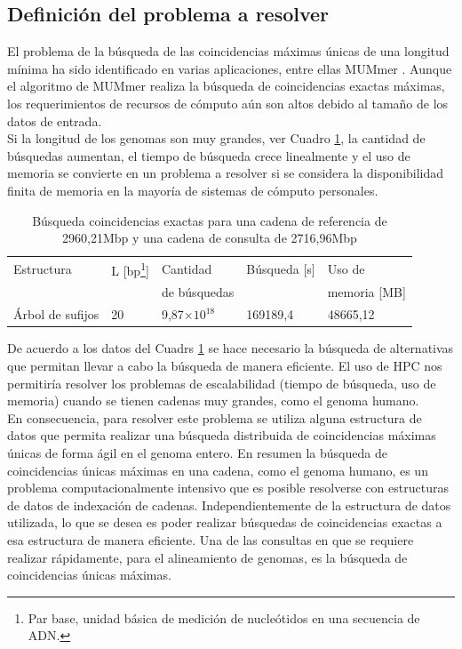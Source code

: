 \documentclass[12pt,a4paper]{article}
\providecommand{\e}[1]{\ensuremath{\times 10^{#1}}}
\begin{document}
\subsection{Definición del problema a resolver}
\indent
El problema de la búsqueda de las coincidencias máximas únicas de una longitud mínima ha sido identificado en varias aplicaciones, entre ellas MUMmer \cite{Mummer3}. Aunque el algoritmo de MUMmer realiza la búsqueda de coincidencias exactas máximas, los requerimientos de recursos de cómputo aún son altos debido al tamaño de los datos de entrada.\\
\indent
Si la longitud de los genomas son muy grandes, ver Cuadro \ref{tab:buscar3}, 
la cantidad de búsquedas aumentan, el tiempo de búsqueda
crece linealmente y el uso de memoria se convierte en un problema a resolver si
se considera la disponibilidad finita de memoria en la mayoría de sistemas de
cómputo personales.\\
\begin{table}[ h!]
  \begin{small}
    \begin{center}
      \begin{tabular}{lllll}
        Estructura & L [bp\footnote{Par base, unidad básica de medición de nucleótidos en una secuencia de ADN.}] & Cantidad  & Búsqueda [s] & Uso de\\
        & & de búsquedas & & memoria [MB]\\
        \hline
        Árbol de sufijos & 20 & 9,87\e{18}  & 169189,4 & 48665,12\\
        \hline
      \end{tabular}
    \end{center}
  \end{small}
  \caption{Búsqueda coincidencias exactas para una cadena de referencia de 
  2960,21Mbp y una cadena de consulta de 2716,96Mbp}
  \label{tab:buscar3}
\end{table}
\indent
De acuerdo a los datos del Cuadrs \ref{tab:buscar3} se hace necesario la búsqueda de alternativas que 
permitan llevar a cabo la búsqueda de manera eficiente. El uso de HPC nos permitiría
resolver los problemas de escalabilidad (tiempo de búsqueda, uso de memoria) cuando 
se tienen cadenas muy grandes, como el genoma humano.\\
En consecuencia, para resolver este problema se utiliza alguna estructura de datos que 
permita realizar una búsqueda distribuida de coincidencias máximas únicas de forma ágil 
en el genoma entero. 
\indent
En resumen la búsqueda de coincidencias únicas máximas en una cadena, como el 
genoma humano, es un problema computacionalmente intensivo que es posible 
resolverse con estructuras de datos de indexación de cadenas. 
\indent
Independientemente de la estructura de datos utilizada, lo que se desea es poder realizar búsquedas de coincidencias exactas a esa estructura de manera eficiente. 
Una de las consultas en que se requiere realizar rápidamente, para el alineamiento de genomas, es la búsqueda de coincidencias únicas máximas. 
\end{document}
